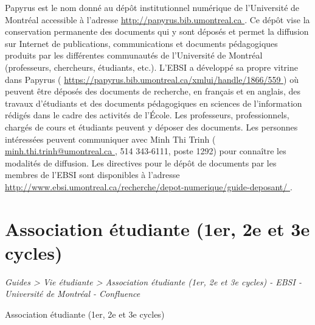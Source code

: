 \documentclass [12 pt]{article}
\begin{document}
            Papyrus est le nom donné au dépôt institutionnel numérique de l'Université de
                Montréal accessible à l'adresse 
        \href{
        http://papyrus.bib.umontreal.ca
        } {
        http://papyrus.bib.umontreal.ca
        }
    . Ce dépôt vise la conservation permanente
                des documents qui y sont déposés et permet la diffusion sur Internet de
                publications, communications et documents pédagogiques produits par les différentes
                communautés de l'Université de Montréal (professeurs, chercheurs, étudiants,
                etc.).
            L'EBSI a développé sa propre vitrine dans Papyrus (
        \href{
        https://papyrus.bib.umontreal.ca/xmlui/handle/1866/559
        } {
        https://papyrus.bib.umontreal.ca/xmlui/handle/1866/559
        }
    ) où peuvent être
                déposés des documents de recherche, en français et en anglais, des travaux
                d'étudiants et des documents pédagogiques en sciences de l'information rédigés dans
                le cadre des activités de l'École. Les professeurs, professionnels, chargés de cours
                et étudiants peuvent y déposer des documents. Les personnes intéressées peuvent
                communiquer avec Minh Thi Trinh (
        \href{
        mailto:minh.thi.trinh@umontreal.ca
        } {
        minh.thi.trinh@umontreal.ca
        }
    , 514
                343-6111, poste 1292) pour connaître les modalités de diffusion. Les directives pour
                le dépôt de documents par les membres de l'EBSI sont disponibles à l'adresse 
        \href{
        http://www.ebsi.umontreal.ca/recherche/depot-numerique/guide-deposant/
        } {
        http://www.ebsi.umontreal.ca/recherche/depot-numerique/guide-deposant/
        }
    .
        
    
    
        \newpage
        \section {
        Association étudiante (1er, 2e et 3e cycles)
        }
        
        
        
        \textit{
        Guides > Vie étudiante > Association étudiante (1er, 2e et 3e cycles) - EBSI -
            Université de Montréal - Confluence
        }
    
        Association étudiante (1er, 2e et 3e cycles)
        
\end{document}
